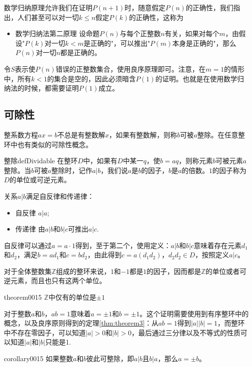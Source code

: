 数学归纳原理允许我们在证明$P(n+1)$时，随意假定$P(n)$的正确性，我们指出，人们甚至可以对一切$k \le n$假定$P(k)$的正确性，这称为
\begin{itemize}
\item \textcolor{main}{数学归纳法第二原理} 设命题$P(n)$与每个正整数$n$有关，如果对每个$m$，由假设"$P(k)$对一切$k <m$是正确的"，可以推出"$P(m)$本身是正确的"，那么$P(n)$对一切$n$都是正确的。
\end{itemize}

令$S$表示使$P(n)$错误的正整数集合，使用良序原理即可。注意，在$m=1$的情形中，所有$k<1$的集合是空的，因此必须暗含$P(1)$的证明。也就是在使用数学归纳法的时候，都需要证明$P(1)$成立。

\subsection{可除性}
整系数方程$ax=b$不总是有整数解$x$，如果有整数解，则称$b$可被$a$整除。在任意整环中也有类似的可除性概念。
\begin{definition}{整除}{defDividable}
在整环$D$中，如果有$D$中某一$q$，使$b=aq$，则称元素$b$可被元素$a$整除。当$b$可被$a$整除时，记作$a|b$，我们说$a$是$b$的因子，$b$是$a$的倍数。$1$的因子称为$D$的单位或可逆元素。
\end{definition}
关系$a|b$满足自反律和传递律：
\begin{itemize}
\item 自反律 $a|a$;
\item 传递律 由$a|b$和$b|c$可推出$a|c$.
\end{itemize}
自反律可以通过$a=a\cdot{}1$得到，至于第二个，使用定义：$a|b$和$b|c$意味着存在元素$d_1$和$d_2$，满足$b=ad_1$和$c=bd_2$，由此得到$c=a(d_1d_2)$，$d_2d_2 \in D$，按照定义$a|c$。


对于全体整数集$\mathbb{Z}$组成的整环来说，$1$和$-1$都是$1$的因子，因而都是$\mathbb{Z}$的单位或者可逆元素，而且也只有这两个单位。
\begin{theorem}{}{theorem0015}
$\mathbb{Z}$中仅有的单位是$\pm1$
\end{theorem}
对于整数$a$和$b$，$ab=1$意味着$a=\pm1$和$b=\pm1$。这个证明需要使用到有序整环中的概念，以及良序原则得到的定理\ref{thm:theorem3}：从$ab=1$得到$|a||b|=1$，而整环中不存在零因子，可以知道$|a|>0$和$|b|>0$，最后通过三分律以及不等式的性质可以知道$|a|$和$|b|$只能是1.

\begin{corollary}{}{corollary0015}
如果整数$a$和$b$彼此可整除，即$a|b$且$b|a$，那么$a=\pm{}b$。
\end{corollary}

